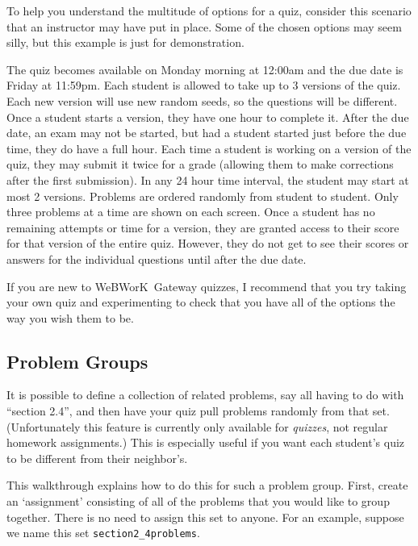 \documentclass[12pt]{article}
\newcommand{\WW}{WeBWorK}
\begin{document}
To help you understand the multitude of options for a quiz, consider this scenario that an instructor may have put in place.
Some of the chosen options may seem silly, but this example is just for demonstration.

\hfill\begin{minipage}{0.9\textwidth}
	The quiz becomes available on Monday morning at 12:00{\sc am} and the due date is Friday at 11:59{\sc pm}.
	Each student is allowed to take up to 3 versions of the quiz.
	Each new version will use new random seeds, so the questions will be different.
	Once a student starts a version, they have one hour to complete it.
	After the due date, an exam may not be started, but had a student started just before the due time, they do have a full hour.
	Each time a student is working on a version of the quiz, they may submit it twice for a grade (allowing them to make corrections after the first submission).
	In any 24 hour time interval, the student may start at most 2 versions.
	Problems are ordered randomly from student to student.
	Only three problems at a time are shown on each screen.
	Once a student has no remaining attempts or time for a version, they are granted access to their score for that version of the entire quiz.
	However, they do not get to see their scores or answers for the individual questions until after the due date.
\end{minipage}

If you are new to \WW\ Gateway quizzes, I recommend that you try taking your own quiz and experimenting to check that you have all of the options the way you wish them to be.

\subsection{Problem Groups}\label{groups}

It is possible to define a collection of related problems, say all having to do with ``section 2.4'', and then have your quiz pull problems randomly from that set.
(Unfortunately this feature is currently only available for \emph{quizzes}, not regular homework assignments.) This is especially useful if you want each student's quiz to be different from their neighbor's.

This walkthrough explains how to do this for such a problem group.
First, create an `assignment' consisting of all of the problems that you would like to group together.
There is no need to assign this set to anyone.
For an example, suppose we name this set \texttt{section2\_4problems}.
\end{document}

